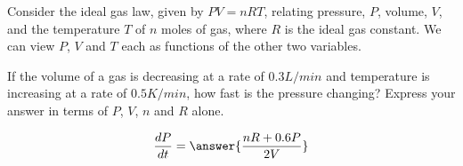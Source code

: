 \documentclass{ximera}
\author{David Guichard \and Neal Koblitz \and H. Jerome Keisler \and Albert Scheller \and Barry Balof \and Mike Wills \and Matthew Carr}
\begin{document}
\begin{exercise}




Consider the ideal gas law, given by $PV=nRT$, relating pressure, $P$, volume, $V$, and the temperature $T$ of $n$ moles of gas, where $R$ is the ideal gas constant. We can view $P$, $V$ and $T$ each as functions of the other two variables. 

If the volume of a gas is decreasing at a rate of $0.3\unit{L/min}$ and temperature is increasing at a rate of $0.5\unit{K/min}$, how fast is the pressure changing? Express your answer in terms of $P$, $V$, $n$ and $R$ alone.

\begin{prompt}
\[
\frac{d P}{d t}=\answer{\frac{n R+0.6 P}{2V}}
\]
\end{prompt}

\end{exercise}
\end{document}
